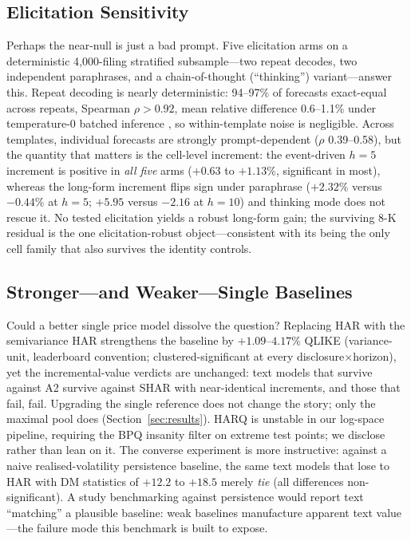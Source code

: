 \subsection{Elicitation Sensitivity}
\label{sec:ab-elicitation}

Perhaps the near-null is just a bad prompt. Five elicitation arms on a deterministic 4{,}000-filing stratified subsample---two repeat decodes, two independent paraphrases, and a chain-of-thought (``thinking'') variant---answer this. Repeat decoding is nearly deterministic: 94--97\% of forecasts exact-equal across repeats, Spearman $\rho>0.92$, mean relative difference 0.6--1.1\% under temperature-0 batched inference \citep{kwon2023vllm}, so within-template noise is negligible. Across templates, individual forecasts are strongly prompt-dependent ($\rho$ 0.39--0.58), but the quantity that matters is the cell-level increment: the event-driven $h{=}5$ increment is positive in \emph{all five} arms ($+0.63$ to $+1.13\%$, significant in most), whereas the long-form increment flips sign under paraphrase ($+2.32\%$ versus $-0.44\%$ at $h{=}5$; $+5.95$ versus $-2.16$ at $h{=}10$) and thinking mode does not rescue it. No tested elicitation yields a robust long-form gain; the surviving 8-K residual is the one elicitation-robust object---consistent with its being the only cell family that also survives the identity controls.

\subsection{Stronger---and Weaker---Single Baselines}
\label{sec:ab-baselines}

Could a better single price model dissolve the question? Replacing HAR with the semivariance HAR \citep{pattonsheppard2015shar} strengthens the baseline by $+1.09$--$4.17\%$ QLIKE (variance-unit, leaderboard convention; clustered-significant at every disclosure$\times$horizon), yet the incremental-value verdicts are unchanged: text models that survive against A2 survive against SHAR with near-identical increments, and those that fail, fail. Upgrading the single reference does not change the story; only the maximal pool does (Section~\ref{sec:results}). HARQ \citep{bollerslev2016harq} is unstable in our log-space pipeline, requiring the BPQ insanity filter on extreme test points; we disclose rather than lean on it. The converse experiment is more instructive: against a naive realised-volatility persistence baseline, the same text models that lose to HAR with DM statistics of $+12.2$ to $+18.5$ merely \emph{tie} (all differences non-significant). A study benchmarking against persistence would report text ``matching'' a plausible baseline: weak baselines manufacture apparent text value---the failure mode this benchmark is built to expose.

